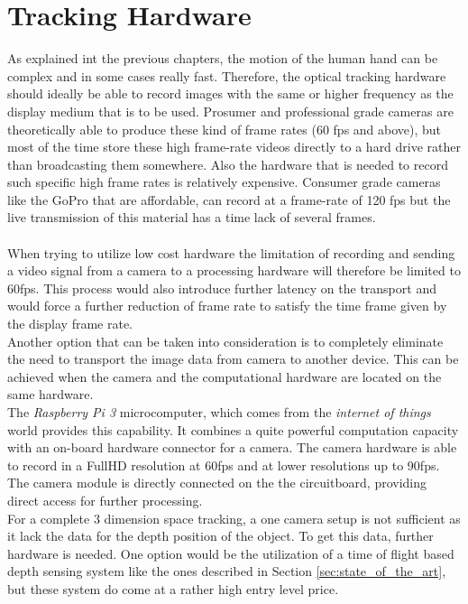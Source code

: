 \section{Tracking Hardware}
 As explained int the previous chapters, the motion of the human hand can be complex and in some cases really fast. Therefore, the optical tracking hardware should ideally be able to record images with the same or higher frequency as the display medium that is to be used. Prosumer and professional grade cameras are theoretically able to produce these kind of frame rates (60 fps and above), but most of the time store these high frame-rate videos directly to a hard drive rather than broadcasting them somewhere. Also the hardware that is needed to record such specific high frame rates is relatively expensive. Consumer grade cameras like the GoPro that are affordable, can record at a frame-rate of 120 fps but the live transmission of this material has a time lack of several frames.\\
\\When trying to utilize low cost hardware the limitation of recording and sending a video signal from a camera to a processing hardware will therefore be limited to 60fps. This process would also introduce further latency on the transport and would force a further reduction of frame rate to satisfy the time frame given by the display frame rate.
\\Another option that can be taken into consideration is to completely eliminate the need to transport the image data from camera to another device. This can be achieved when the camera and the computational hardware are located on the same hardware.\\The \textit{Raspberry Pi 3} microcomputer, which comes from the \textit{internet of things} world provides this capability. It combines a quite powerful computation capacity with an on-board hardware connector for a camera. The camera hardware is able to record in a FullHD resolution at 60fps and at lower resolutions up to 90fps. The camera module is directly connected on the the circuitboard, providing direct access for further processing.\\
For a complete 3 dimension space tracking, a one camera setup is not sufficient as it lack the data for the depth position of the object. To get this data, further hardware is needed. One option would be the utilization of a time of flight based depth sensing system like the ones described in Section \ref{sec:state_of_the_art}, but these system do come at a rather high entry level price.
